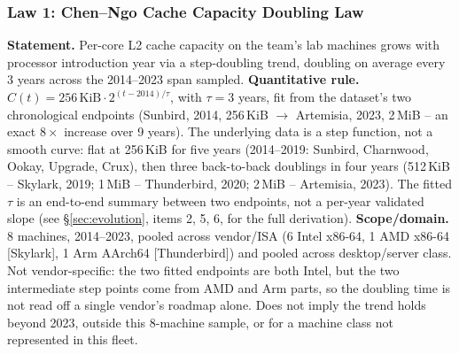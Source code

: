 \documentclass{article}
\begin{document}
\subsubsection*{Law 1: Chen--Ngo Cache Capacity Doubling Law}

\textbf{Statement.} Per-core L2 cache capacity on the team's lab machines grows with processor
introduction year via a step-doubling trend, doubling on average every 3 years across the 2014--2023
span sampled.
\noindent
\textbf{Quantitative rule.} $C(t) = 256\,\text{KiB} \cdot 2^{(t - 2014)/\tau}$, with $\tau = 3$ years,
fit from the dataset's two chronological endpoints (Sunbird, 2014, 256\,KiB $\to$ Artemisia, 2023,
2\,MiB -- an exact $8\times$ increase over 9 years). The underlying data is a step function, not a
smooth curve: flat at 256\,KiB for five years (2014--2019: Sunbird, Charnwood, Ookay, Upgrade, Crux),
then three back-to-back doublings in four years (512\,KiB -- Skylark, 2019; 1\,MiB -- Thunderbird,
2020; 2\,MiB -- Artemisia, 2023). The fitted $\tau$ is an end-to-end summary between two endpoints, not
a per-year validated slope (see \S\ref{sec:evolution}, items 2, 5, 6, for the full derivation).
\noindent
\textbf{Scope/domain.} 8 machines, 2014--2023, pooled across vendor/ISA (6 Intel x86-64, 1 AMD
x86-64 [Skylark], 1 Arm AArch64 [Thunderbird]) and pooled across desktop/server class. Not
vendor-specific: the two fitted endpoints are both Intel, but the two intermediate step points come
from AMD and Arm parts, so the doubling time is not read off a single vendor's roadmap alone. Does not
imply the trend holds beyond 2023, outside this 8-machine sample, or for a machine class not
represented in this fleet.
\end{document}
